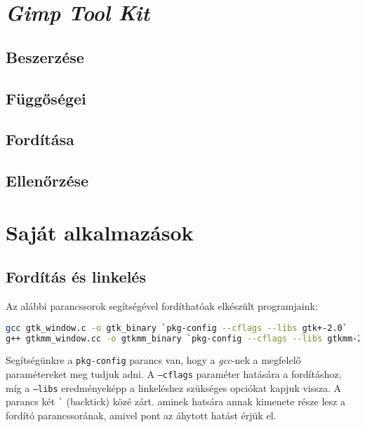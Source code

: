 \section{\textit{Gimp Tool Kit}}

\subsection{Beszerzése}

\subsection{Függőségei}

\subsection{Fordítása}

\subsection{Ellenőrzése}

\section{Saját alkalmazások}

\subsection{Fordítás és linkelés}

Az alábbi parancssorok segítségével fordíthatóak elkészült programjaink:

\begin{lstlisting}[language=sh, numbers=none, basicstyle=\ttfamily, keywordsprefix=window, keywordstyle=\itshape, basewidth={0.5em, 0.4em}]
gcc gtk_window.c -o gtk_binary `pkg-config --cflags --libs gtk+-2.0`
g++ gtkmm_window.cc -o gtkmm_binary `pkg-config --cflags --libs gtkmm-2.4`
\end{lstlisting}

Segítségünkre a \texttt{pkg-config} parancs van, hogy a \textit{gcc}-nek a megfelelő paramétereket meg tudjuk adni. A \texttt{--cflags} paraméter hatására a fordításhoz, míg a \texttt{--libs} eredményeképp a linkeléshez szükséges opciókat kapjuk vissza. A parancs két \texttt{\`} (backtick) közé zárt. aminek hatsára annak kimenete része lesz a fordító parancssorának, amivel pont az áhytott hatást érjük el.


